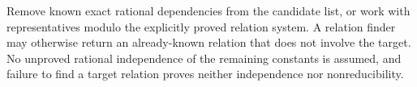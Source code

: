 Remove known exact rational dependencies from the candidate list, or work
with representatives modulo the explicitly proved relation system. A
relation finder may otherwise return an already-known relation that does not
involve the target. No unproved rational independence of the remaining
constants is assumed, and failure to find a target relation proves neither
independence nor nonreducibility.
